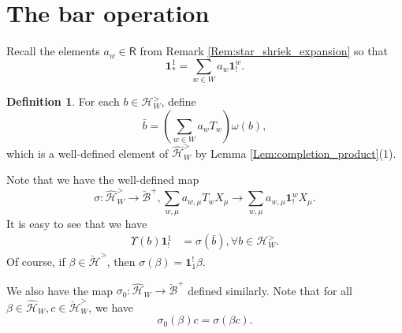 \documentclass{amsart}
\newcommand{\Hecke}{\mathcal{H}}
\newcommand{\Z}{\mathbb{Z}}
\newcommand{\Ring}{\mathsf{R}}
\newcommand{\bone}{\mathbf{1}}
\theoremstyle{definition}
\newtheorem{defi}[Thm]{Definition}
\newtheorem{Rem}[Thm]{Remark}
\numberwithin{equation}{section}
\begin{document}


\section{The bar operation}\label{sec:barinvolution}

Recall the elements $a_w\in \Ring$ from Remark \ref{Rem:star_shriek_expansion} so that
\begin{equation}\label{eq:star_shriek_expansion}
\bone_*^1=\sum_{w\in W}a_w \bone_!^w.
\end{equation}
\begin{defi}
    For each $b\in \Hecke_W^{>}$, define
$$\bar{b}=(\sum_{w\in W}a_w T_w)\omega(b),$$
which is a well-defined element of $\widehat{\Hecke}_W^{>}$ by Lemma \ref{Lem:completion_product}(1).
\end{defi}

Note that we have the  well-defined map $$\sigma:\widehat{\mathcal{H}}_W^>\rightarrow \breve{\mathcal{B}}^+, \sum_{w,\mu}a_{w,\mu}T_w X_\mu\rightarrow \sum_{w,\mu}a_{w,\mu}\bone^w_! X_\mu.$$   It is easy to see that we have
\begin{align}
    \Upsilon(b)\bone_!^1 & = \sigma(\bar{b}), \forall b\in \Hecke^>_W.
\end{align}
Of course, if $\beta\in \breve{\mathcal{H}}^>$, then $\sigma(\beta)=\bone^!_1 \beta$.


We also have the map $\sigma_0:\widehat{\Hecke}_W\rightarrow \breve{\mathcal{B}}^+$ defined similarly. Note that for all $\beta\in \widehat{\mathcal{H}}_W, c\in \breve{\Hecke}^>_W$, we have
\begin{equation}\label{eq:bimod_assoc_sigma}
\sigma_0(\beta)c=\sigma(\beta c).
\end{equation}
\end{document}
